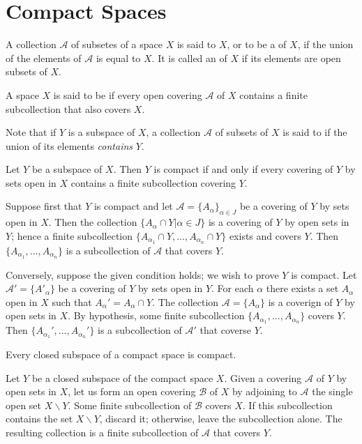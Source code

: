 \documentclass[12pt, a4paper, twoside, openright, titlepage]{book}
\begin{document}
\section{Compact Spaces}

\begin{defn}{}{}
    A collection $\mathcal{A}$ of subsetes of a space $X$ is said to  $X$, or to be a  of $X$, if the union of the elements of $\mathcal{A}$ is equal to $X$. It is called an  of $X$ if its elements are open subsets of $X$.
\end{defn}

\begin{defn}{}{}
    A space $X$ is said to be  if every open covering $\mathcal{A}$ of $X$ contains a finite subcollection that also covers $X$.
\end{defn}


Note that if $Y$ is a subspace of $X$, a collection $\mathcal{A}$ of subsets of $X$ is said to  if the union of its elements \emph{contains} $Y$.

\begin{lem}{}{}
     Let $Y$ be a subspace of $X$. Then $Y$ is compact if and only if every covering of $Y$ by sets open in $X$ contains a finite subcollection covering $Y$.
\end{lem}
\begin{proof*}{}{}
    Suppose first that $Y$ is compact and let $\mathcal{A} = \{A_{\alpha}\}_{\alpha \in J}$ be a covering of $Y$ by sets open in $X$. Then the collection $\{A_{\alpha} \cap Y\vert \alpha \in J\}$ is a covering of $Y$ by open sets in $Y$; hence a finite subcollection $\{A_{\alpha_1}\cap Y,...,A_{\alpha_n}\cap Y\}$ exists and covers $Y$. Then $\{A_{\alpha_1},...,A_{\alpha_n}\}$ is a subcollection of $\mathcal{A}$ that covers $Y$.

    Conversely, suppose the given condition holds; we wish to prove $Y$ is compact. Let $\mathcal{A}' = \{A'_{\alpha}\}$ be a covering of $Y$ by sets open in $Y$. For each $\alpha$ there exists a set $A_{\alpha}$ open in $X$ such that $A_{\alpha}' = A_{\alpha}\cap Y$. The collection $\mathcal{A} = \{A_{\alpha}\}$ is a coverign of $Y$ by open sets in $X$. By hypothesis, some finite subcollection $\{A_{\alpha_1},...,A_{\alpha_n}\}$ covers $Y$. Then $\{A_{\alpha_1}',...,A_{\alpha_n}'\}$ is a subcollection of $\mathcal{A}'$ that coverse $Y$.
\end{proof*}

\begin{thm}{}{}
    Every closed subspace of a compact space is compact.
\end{thm}
\begin{proof*}{}{}
    Let $Y$ be a closed subspace of the compact space $X$. Given a covering $\mathcal{A}$ of $Y$ by open sets in $X$, let us form an open covering $\mathcal{B}$ of $X$ by adjoining to $\mathcal{A}$ the single open set $X\backslash Y$. Some finite subcollection of $\mathcal{B}$ covers $X$. If this subcollection contains the set $X\backslash Y$, discard it; otherwise, leave the subcollection alone. The resulting collection is a finite subcollection of $\mathcal{A}$ that covers $Y$.
\end{proof*}
\end{document}
